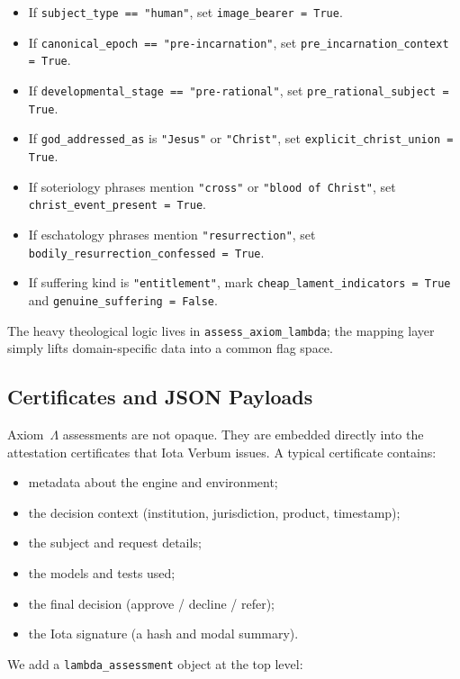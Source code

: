 \documentclass[11pt]{article}
\begin{document}
\begin{itemize}
  \item If \texttt{subject\_type == "human"}, set \texttt{image\_bearer = True}.
  \item If \texttt{canonical\_epoch == "pre-incarnation"}, set \texttt{pre\_incarnation\_context = True}.
  \item If \texttt{developmental\_stage == "pre-rational"}, set \texttt{pre\_rational\_subject = True}.
  \item If \texttt{god\_addressed\_as} is \texttt{"Jesus"} or \texttt{"Christ"}, set \texttt{explicit\_christ\_union = True}.
  \item If soteriology phrases mention \texttt{"cross"} or \texttt{"blood of Christ"}, set \texttt{christ\_event\_present = True}.
  \item If eschatology phrases mention \texttt{"resurrection"}, set \texttt{bodily\_resurrection\_confessed = True}.
  \item If suffering kind is \texttt{"entitlement"}, mark \texttt{cheap\_lament\_indicators = True} and \texttt{genuine\_suffering = False}.
\end{itemize}

The heavy theological logic lives in \texttt{assess\_axiom\_lambda}; the mapping layer simply lifts domain-specific data into a common flag space.

\subsection{Certificates and JSON Payloads}

Axiom~$\Lambda$ assessments are not opaque. They are embedded directly into the attestation certificates that Iota Verbum issues. A typical certificate contains:

\begin{itemize}
  \item metadata about the engine and environment;
  \item the decision context (institution, jurisdiction, product, timestamp);
  \item the subject and request details;
  \item the models and tests used;
  \item the final decision (approve / decline / refer);
  \item the Iota signature (a hash and modal summary).
\end{itemize}

We add a \texttt{lambda\_assessment} object at the top level:
\end{document}
